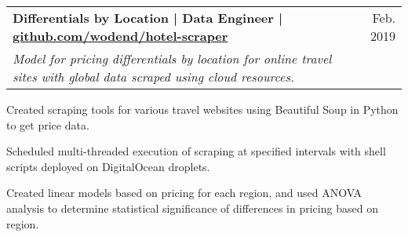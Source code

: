 \documentclass{article}
\makeatletter
\newcommand{\beginResumeList}{\begin{itemize}\setlength\itemsep{0em}\begin{minipage}{0.9\textwidth}}
\newcommand{\resumeListEnd}{\end{minipage}\end{itemize}}
\newcommand{\normalItem}[1]{\normalsize\item{#1}}
\newcommand{\education}[3]{
  \begin{tabular*}{\textwidth}[t]{l@{\extracolsep{\fill}}r}
    \normalsize\textbf{#1, }\textit{#2} & \normalsize #3 \\
  \end{tabular*}\vspace{-5pt}
}
\newcommand{\project}[3]{
  \begin{tabular*}{\textwidth}[t]{l@{\extracolsep{\fill}}r}
    \normalsize\textbf{#1} & \normalsize #2 \\
    \normalsize\textit{#3}
  \end{tabular*}
}
\makeatother
\begin{document}
  \project
    {Differentials by Location | Data Engineer | \href{https://github.com/wodend/hotel-scraper}{github.com/wodend/hotel-scraper}}
    {Feb. 2019} %
    {Model for pricing differentials by location for online travel sites with global data scraped using cloud resources.}
    \beginResumeList
      \normalItem{Created scraping tools for various travel websites using Beautiful Soup in Python to get price data.}
      \normalItem{Scheduled multi-threaded execution of scraping at specified intervals with shell scripts deployed on DigitalOcean droplets.}
      \normalItem{Created linear models based on pricing for each region, and used ANOVA analysis to determine statistical significance of differences in pricing based on region.}
    \resumeListEnd


\end{document}
